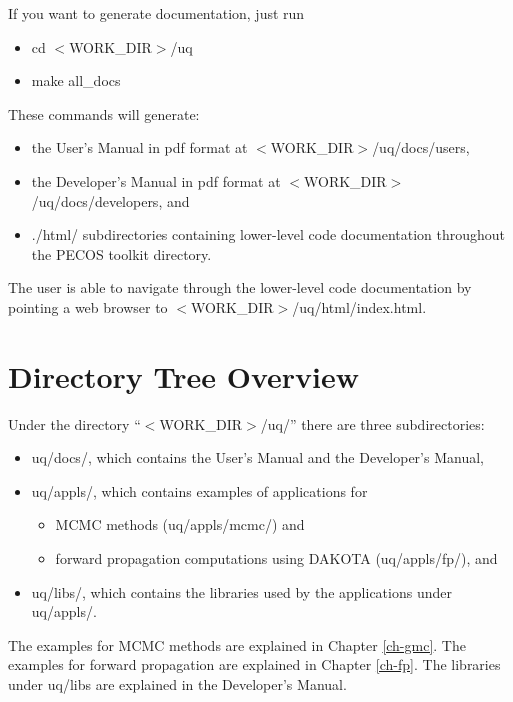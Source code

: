 If you want to generate documentation, just run
\begin{itemize}
\item cd $<$WORK\_DIR$>$/uq
\item make all\_docs
\end{itemize}
These commands will generate:
\begin{itemize}
\item the User's Manual in pdf format at $<$WORK\_DIR$>$/uq/docs/users,
\item the Developer's Manual in pdf format at $<$WORK\_DIR$>$/uq/docs/developers, and
\item ./html/ subdirectories containing lower-level code documentation throughout the PECOS toolkit directory.
\end{itemize}
The user is able to navigate through the lower-level code documentation by pointing a web browser to $<$WORK\_DIR$>$/uq/html/index.html.

\section{Directory Tree Overview}

Under the directory ``$<$WORK\_DIR$>$/uq/'' there are three subdirectories:
\begin{itemize}
\item uq/docs/, which contains the User's Manual and the Developer's Manual,
\item {uq/appls/, which contains examples of applications for
\begin{itemize}
\item MCMC methods (uq/appls/mcmc/) and
\item forward propagation computations using DAKOTA (uq/appls/fp/), and
\end{itemize}
}
\item uq/libs/, which contains the libraries used by the applications under uq/appls/.
\end{itemize}

The examples for MCMC methods are explained in Chapter \ref{ch-gmc}.
The examples for forward propagation are explained in Chapter \ref{ch-fp}.
The libraries under uq/libs are explained in the Developer's Manual.
